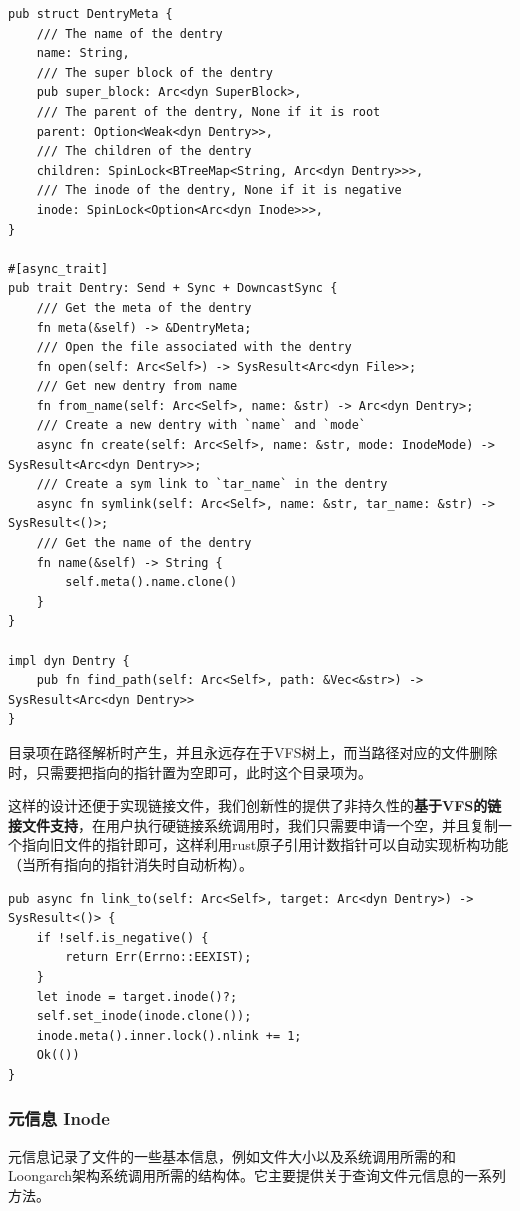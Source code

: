 \documentclass{article}
\begin{document}
\begin{lstlisting}
pub struct DentryMeta {
    /// The name of the dentry
    name: String,
    /// The super block of the dentry
    pub super_block: Arc<dyn SuperBlock>,
    /// The parent of the dentry, None if it is root
    parent: Option<Weak<dyn Dentry>>,
    /// The children of the dentry
    children: SpinLock<BTreeMap<String, Arc<dyn Dentry>>>,
    /// The inode of the dentry, None if it is negative
    inode: SpinLock<Option<Arc<dyn Inode>>>,
}

#[async_trait]
pub trait Dentry: Send + Sync + DowncastSync {
    /// Get the meta of the dentry
    fn meta(&self) -> &DentryMeta;
    /// Open the file associated with the dentry
    fn open(self: Arc<Self>) -> SysResult<Arc<dyn File>>;
    /// Get new dentry from name
    fn from_name(self: Arc<Self>, name: &str) -> Arc<dyn Dentry>;
    /// Create a new dentry with `name` and `mode`
    async fn create(self: Arc<Self>, name: &str, mode: InodeMode) -> SysResult<Arc<dyn Dentry>>;
    /// Create a sym link to `tar_name` in the dentry
    async fn symlink(self: Arc<Self>, name: &str, tar_name: &str) -> SysResult<()>;
    /// Get the name of the dentry
    fn name(&self) -> String {
        self.meta().name.clone()
    }
}

impl dyn Dentry {
    pub fn find_path(self: Arc<Self>, path: &Vec<&str>) -> SysResult<Arc<dyn Dentry>> 
}
\end{lstlisting}

目录项在路径解析时产生，并且永远存在于VFS树上，而当路径对应的文件删除时，只需要把指向的指针置为空即可，此时这个目录项为。

这样的设计还便于实现链接文件，我们创新性的提供了非持久性的\textbf{基于VFS的链接文件支持}，在用户执行硬链接系统调用时，我们只需要申请一个空，并且复制一个指向旧文件的指针即可，这样利用rust原子引用计数指针可以自动实现析构功能（当所有指向的指针消失时自动析构）。

\begin{lstlisting}
pub async fn link_to(self: Arc<Self>, target: Arc<dyn Dentry>) -> SysResult<()> {
    if !self.is_negative() {
        return Err(Errno::EEXIST);
    }
    let inode = target.inode()?;
    self.set_inode(inode.clone());
    inode.meta().inner.lock().nlink += 1;
    Ok(())
}
\end{lstlisting}


\subsubsection{元信息 Inode}
元信息记录了文件的一些基本信息，例如文件大小以及系统调用所需的和Loongarch架构系统调用所需的结构体。它主要提供关于查询文件元信息的一系列方法。
\end{document}

